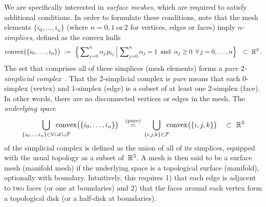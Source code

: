 We are specifically interested in \emph{surface meshes}, which are required to satisfy additional conditions.
In order to formulate these conditions, note that the mesh elements $\{ i_0, \dots, i_n \}$
(where $n=0,1\ \text{or}\ 2$ for vertices, edges or faces)
imply $n$-\emph{simplices}, defined as the convex hulls
\begin{align}
    \operatorname{convex} \!\big(\{ i_0, \dots, i_n \}\big)\ :=\ 
    \Big\{ \sum\nolimits_{j=0}^n \alpha_j\mkern2mu p_{i_j} \,\Big|\, 
    \sum\nolimits_{j=0}^n \alpha_j = 1\,\ \textup{and}\,\ \alpha_j\geq0\,\ \forall\,j=0,\dots,n \Big\}
    \ \ \subset\ \R^3 \,.
\end{align}
The set that comprises all of these simplices (mesh elements) forms a \emph{pure $2$-simplicial complex}~\cite{desbrun2005DiscreteExteriorCalculus,craneDiscreteDifferentialGeometry2014}.
That the 2-simplicial complex is \emph{pure} means that each 0-simplex (vertex) and 1-simplex (edge) is a subset of at least one 2-simplex (face).
In other words, there are no disconnected vertices or edges in the mesh.
The \emph{underlying space}
\begin{align}
    \bigcup_{\{ i_0, \dots, i_n \} \in \mathcal{V} \cup \mathcal{E} \cup \mathcal{F}}
    \mkern-40mu
    \operatorname{convex} \!\big( \{ i_0, \dots, i_n \}\big)
    \ \ \overset{\textup{(pure)}}{=}\,
    \bigcup_{\{i,j,k\} \in \mathcal{F}}
    \mkern-10mu
    \operatorname{convex} \!\big( \{i,j,k\}\big)
    \ \ \ \subset\ \R^3
\end{align}
of the simplicial complex is defined as the union of all of its simplices, equipped with the usual topology as a subset of~$\mathbb{R}^3$.
A mesh is then said to be a surface mesh (manifold mesh) if the underlying space is a topological surface (manifold), optionally with boundary.
Intuitively, this requires
1) that each edge is adjacent to two faces (or one at boundaries) and
2) that the faces around each vertex form a topological disk (or a half-disk at boundaries).


